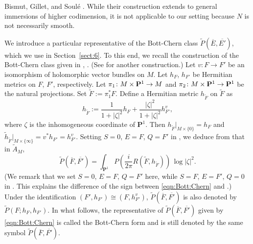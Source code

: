 \documentclass[amscd, leqno]{amsart}
\theoremstyle{plain}
\theoremstyle{definition}
\theoremstyle{remark}
\begin{document}
Bismut, Gillet, and Soul\'e \cite{BGS90b}. While their construction extends to general immersions of higher codimension,
it is not applicable to our setting because $N$ is not necessarily smooth. 
\par
We introduce a particular representative of the Bott-Chern class $\widetilde{P}(\overline{E},\overline{E'})$, 
which we use in Section~\ref{sect:6}. To this end, we recall the construction of the Bott-Chern class given in \cite[I, f)]{BGS88},
\cite[Sect.\,1.2.3]{GilletSoule90}. (See \cite[I, Cor.\,1.30]{BGS88} for another construction.)
Let $v \colon F \to F'$ be an isomorphism of holomorphic vector bundles on $M$.
Let $h_{F}$, $h_{F'}$ be Hermitian metrics on $F$, $F'$, respectively.
Let $\pi_{1}\colon M\times{\bf P}^{1}\to M$ and $\pi_{2}\colon M\times{\bf P}^{1}\to{\bf P}^{1}$ be the natural projections.
Set $\widetilde{F} := \pi_{1}^{*}F$. Define a Hermitian metric $h_{\widetilde{F}}$ on $\widetilde{F}$ as
$$
h_{\widetilde{F}} := \frac{1}{1+|\zeta|^{2}} h_{F} + \frac{|\zeta|^{2}}{1+|\zeta|^{2}} h_{F'}^{v},
$$
where $\zeta$ is the inhomogeneous coordinate of ${\mathbf P}^{1}$.
Then $h_{\widetilde{F}}|_{M \times\{0\}} = h_{F}$ and $\widetilde{h}_{\widetilde{F}}|_{M \times\{\infty\}} = v^{*}h_{F'} = h_{F'}^{v}$.
Setting $S=0$, $E = F$, $Q = F'$ in \cite[Sect.\,1.2.3]{GilletSoule90}, 
we deduce from \cite[(1.2.3.2)]{GilletSoule90} that in $\widetilde{A}_{M}$,
\begin{equation}
\label{eqn:Bott:Chern}
\widetilde{P}( \overline{F}, \overline{F'} ) 
= \int_{{\mathbf P}^{1}} P\left( \frac{i}{2\pi} R(\widetilde{F}, h_{\widetilde{F}}) \right)\, \log |\zeta|^{2}.
\end{equation}
(We remark that we set $S=0$, $E=F$, $Q=F'$ here, while $S=F$, $E=F'$, $Q=0$ in \cite[Sect.\,1.2.4]{GilletSoule90}. 
This explains the difference of the sign between \eqref{eqn:Bott:Chern} and \cite[(1.2.3.2)]{GilletSoule90}.)
Under the identification $(F', h_{F'}) \cong (F, h_{F'}^{v})$,
$\widetilde{P}( \overline{F}, \overline{F'} )$ is also denoted by $\widetilde{P}( F ; h_{F}, h_{F'} )$. 
In what follows, the representative of $\widetilde{P}( \overline{F}, \overline{F'} )$ given by \eqref{eqn:Bott:Chern} 
is called the Bott-Chern form and is still denoted by the same symbol $\widetilde{P}( \overline{F}, \overline{F'} )$.




\end{document}
